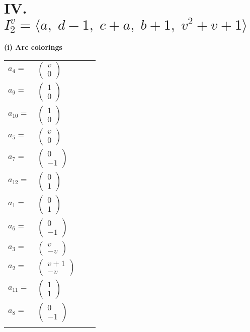 \documentclass[1p]{elsarticle_modified}
\theoremstyle{definition}
\begin{document}
\centering \section*{IV. $I^v_{2}= \langle a,\;d-1,\;c+a,\;b+1,\;v^2+v+1 \rangle$}
\flushleft \textbf{(i) Arc colorings}\\
\begin{tabular}{m{7pt} m{180pt} m{7pt} m{180pt} }
\flushright $a_{4}=$&$\begin{pmatrix}v\\0\end{pmatrix}$ \\
\flushright $a_{9}=$&$\begin{pmatrix}1\\0\end{pmatrix}$ \\
\flushright $a_{10}=$&$\begin{pmatrix}1\\0\end{pmatrix}$ \\
\flushright $a_{5}=$&$\begin{pmatrix}v\\0\end{pmatrix}$ \\
\flushright $a_{7}=$&$\begin{pmatrix}0\\-1\end{pmatrix}$ \\
\flushright $a_{12}=$&$\begin{pmatrix}0\\1\end{pmatrix}$ \\
\flushright $a_{1}=$&$\begin{pmatrix}0\\1\end{pmatrix}$ \\
\flushright $a_{6}=$&$\begin{pmatrix}0\\-1\end{pmatrix}$ \\
\flushright $a_{3}=$&$\begin{pmatrix}v\\- v\end{pmatrix}$ \\
\flushright $a_{2}=$&$\begin{pmatrix}v+1\\- v\end{pmatrix}$ \\
\flushright $a_{11}=$&$\begin{pmatrix}1\\1\end{pmatrix}$ \\
\flushright $a_{8}=$&$\begin{pmatrix}0\\-1\end{pmatrix}$\\&\end{tabular}
\end{document}
